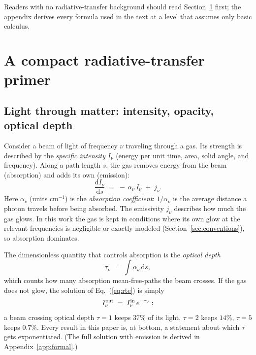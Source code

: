 \documentclass[fleqn,usenatbib]{mnras}
\begin{document}
Readers with no radiative-transfer background should read
Section~\ref{sec:primer} first; the appendix derives every formula used in
the text at a level that assumes only basic calculus.

\section{A compact radiative-transfer primer}
\label{sec:primer}

\subsection{Light through matter: intensity, opacity, optical depth}

Consider a beam of light of frequency $\nu$ traveling through a gas. Its
strength is described by the \emph{specific intensity} $I_\nu$ (energy per
unit time, area, solid angle, and frequency). Along a path length $s$, the
gas removes energy from the beam (absorption) and adds its own (emission):
\begin{equation}
  \frac{\mathrm{d}I_\nu}{\mathrm{d}s} \;=\; -\,\alpha_\nu\, I_\nu \;+\; j_\nu .
  \label{eq:rte}
\end{equation}
Here $\alpha_\nu$ (units cm$^{-1}$) is the \emph{absorption coefficient}:
$1/\alpha_\nu$ is the average distance a photon travels before being
absorbed. The emissivity $j_\nu$ describes how much the gas glows. In this
work the gas is kept in conditions where its own glow at the relevant
frequencies is negligible or exactly modeled (Section~\ref{sec:conventions}),
so absorption dominates.

The dimensionless quantity that controls absorption is the
\emph{optical depth}
\begin{equation}
  \tau_\nu \;=\; \int \alpha_\nu\, \mathrm{d}s ,
  \label{eq:tau}
\end{equation}
which counts how many absorption mean-free-paths the beam crosses. If the gas
does not glow, the solution of Eq.~(\ref{eq:rte}) is simply
\begin{equation}
  I_\nu^{\rm out} \;=\; I_\nu^{\rm in}\, e^{-\tau_\nu}:
  \label{eq:beer}
\end{equation}
a beam crossing optical depth $\tau=1$ keeps $37\%$ of its light, $\tau=2$
keeps $14\%$, $\tau=5$ keeps $0.7\%$. Every result in this paper is,
at bottom, a statement about which $\tau$ gets exponentiated.
(The full solution with emission is derived in Appendix~\ref{app:formal}.)
\end{document}
